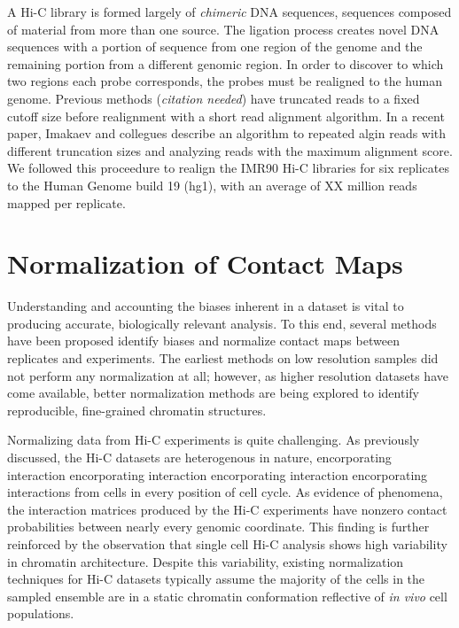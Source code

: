 \documentclass[phd,tocprelim]{cornell}
\begin{document}
A Hi-C library is formed largely of \textit{chimeric} DNA sequences,
sequences composed of material from more than one source.  The ligation process
creates novel DNA sequences with a portion of sequence from one region of
the genome and the remaining portion from a different genomic region.  In
order to discover to which two regions each probe corresponds, the probes
must be realigned to the human genome.  Previous methods (\textit{citation needed})
have truncated reads to a fixed cutoff size before realignment with a short
read alignment algorithm.  In a recent paper, Imakaev and collegues
describe an algorithm to repeated algin reads with different truncation sizes
and analyzing reads with the maximum alignment score\cite{imakaev2012}.  We followed
this proceedure to realign the IMR90 Hi-C libraries for six replicates to
the Human Genome build 19 (hg1), with an average of XX million reads
mapped per replicate.

\section{Normalization of Contact Maps}

Understanding and accounting the biases inherent in a dataset is vital to
producing accurate, biologically relevant analysis.  To this end, several methods
have been proposed identify biases and normalize contact maps between replicates
and experiments\cite{yaffe2011}\cite{hu2012}\cite{yang2014}.  The earliest methods on low
resolution samples did not perform any normalization at all\cite{aiden2009};
however, as higher resolution datasets have come available, better
normalization methods are being explored to identify reproducible,
fine-grained chromatin structures.

Normalizing data from Hi-C experiments is quite challenging.  As previously
discussed, the Hi-C datasets are heterogenous in nature, encorporating interaction encorporating interaction encorporating interaction encorporating
interactions from cells in every position of cell cycle.  As evidence of phenomena,
the interaction matrices produced by the Hi-C experiments have nonzero contact
probabilities between nearly every genomic coordinate\cite{dekker2013}.  This
finding is further reinforced by the observation that single cell Hi-C analysis
shows high variability in chromatin architecture\cite{nagano2013}.  Despite this
variability, existing normalization techniques for Hi-C datasets typically
assume the majority of the cells in the sampled ensemble are in a static
chromatin conformation reflective of \textit{in vivo} cell populations.
\end{document}
